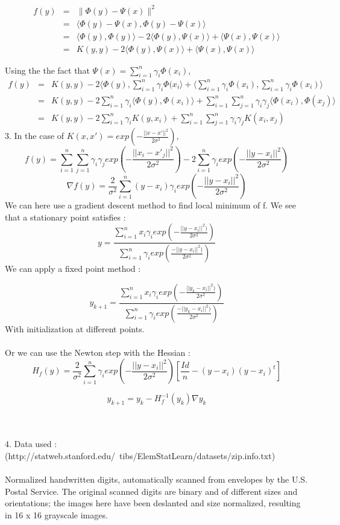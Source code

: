 \begin{eqnarray*}
	f(y) &=& \|\Phi(y) - \Psi(x) \|^2\\
	&=& \langle \Phi(y) - \Psi(x), \Phi(y) - \Psi(x) \rangle \\
	&=& \langle \Phi(y), \Phi(y) \rangle -  2 \langle \Phi(y), \Psi(x) \rangle + \langle \Psi(x), \Psi(x) \rangle\\
	&=& K(y,y) -  2 \langle \Phi(y), \Psi(x) \rangle + \langle \Psi(x), \Psi(x) \rangle
\end{eqnarray*}

Using the the fact that $\Psi(x) = \sum_{i=1}^n \gamma_i \Phi(x_i)$,
\begin{eqnarray*}
	f(y) &=& K(y,y) - 2\langle \Phi(y), \sum_{i=1}^n \gamma_i \Phi(x_i \rangle + \langle \sum_{i=1}^n \gamma_i \Phi(x_i), \sum_{i=1}^n \gamma_i \Phi(x_i) \rangle \\
	&=& K(y,y) - 2\sum_{i=1}^n \gamma_i \langle \Phi(y), \Phi(x_i) \rangle + \sum_{i=1}^n \sum_{j=1}^n \gamma_i\gamma_j\langle  \Phi(x_i),  \Phi(x_j) \rangle \\
	&=& K(y,y) - 2\sum_{i=1}^n \gamma_i K(y,x_i) + \sum_{i=1}^n \sum_{j=1}^n \gamma_i\gamma_j K(x_i,x_j)
\end{eqnarray*}
3. In the case of $K(x,x')=exp(-\frac{||x-x'||^{2}}{2\sigma^{2}})$,
$$f(y)=\sum_{i=1}^{n}\sum_{j=1}^{n}\gamma_{i}\gamma_{j}exp(-\frac{||x_{i}-x'_{j}||^{2}}{2\sigma^{2}})-2\sum_{i=1}^{n}\gamma_{i}exp(-\frac{||y-x_{i}||^{2}}{2\sigma^{2}})$$
$$\nabla f(y)=\frac{2}{\sigma^{2}}\sum_{i=1}^{n}(y-x_{i})\gamma_{i}exp(-\frac{||y-x_{i}||^{2}}{2\sigma^{2}})$$
We can here use a gradient descent method to find local minimum of f. We see that a stationary point satisfies : 
$$y=\frac{\sum_{i=1}^{n}x_{i}\gamma_{i}exp(-\frac{||y-x_{i}||^{2})}{2\sigma^{2}})}{\sum_{i=1}^{n}\gamma_{i}exp(\frac{-||y-x_{i}||^{2})}{2\sigma^{2}})}$$
We can apply a fixed point method :

$$y_{k+1}=\frac{\sum_{i=1}^{n}x_{i}\gamma_{i}exp(-\frac{||y_{k}-x_{i}||^{2})}{2\sigma^{2}})}{\sum_{i=1}^{n}\gamma_{i}exp(\frac{-||y_{k}-x_{i}||^{2})}{2\sigma^{2}})}$$
With initialization at different points.~\\
~\\
Or we can use the Newton step with the Hessian :
$$H_{f}(y)=\frac{2}{\sigma^{2}} \sum_{i=1}^{n}\gamma_{i}exp(-\frac{||y-x_{i}||^{2}}{2\sigma^{2}})[\frac{Id}{n}-(y-x_{i})(y-x_{i})^{t} ]$$

$$y_{k+1}=y_{k}-H_{f}^{-1}(y_{k})\nabla y_{k}$$

~\\
~\\
4. Data used : (http://statweb.stanford.edu/~tibs/ElemStatLearn/datasets/zip.info.txt)
~\\
~\\
Normalized handwritten digits, automatically scanned from envelopes by the U.S. Postal Service. The original
scanned digits are binary and of different sizes and orientations; the
images  here have been deslanted and size normalized, resulting
in 16 x 16 grayscale images.



